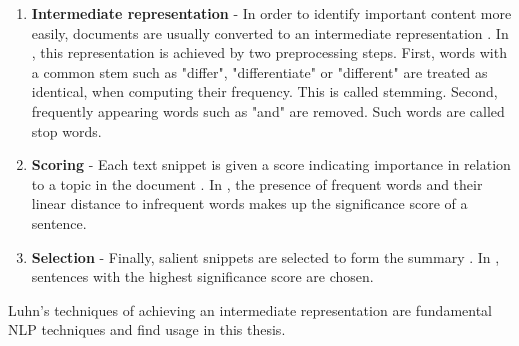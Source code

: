 \begin{enumerate}
\label{threestep}
\item \textbf{Intermediate representation} - In order to identify important content more easily, documents are usually converted to an intermediate representation \cite{DBLP:books/sp/mining2012/NenkovaM12}. In \cite{DBLP:journals/ibmrd/Luhn58}, this representation is achieved by two preprocessing steps. First, words with a common stem such as "differ", "differentiate" or "different" are treated as identical, when computing their frequency. This is called stemming. Second, frequently appearing words such as "and" are removed. Such words are called stop words.
\item \textbf{Scoring} - Each text snippet is given a score indicating importance in relation to a topic in the document \cite{DBLP:books/sp/mining2012/NenkovaM12}. In \cite{DBLP:journals/ibmrd/Luhn58}, the presence of frequent words and their linear distance to infrequent words makes up the significance score of a sentence.
\item \textbf{Selection} - Finally, salient snippets are selected to form the summary \cite{DBLP:books/sp/mining2012/NenkovaM12}. In \cite{DBLP:journals/ibmrd/Luhn58}, sentences with the highest significance score are chosen.
\end{enumerate}
Luhn's \cite{DBLP:journals/ibmrd/Luhn58} techniques of achieving an intermediate representation are fundamental NLP techniques and find usage in this thesis.

